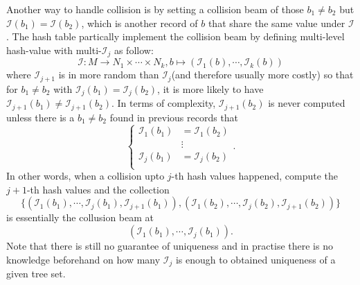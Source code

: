 \documentclass[11pt]{article}
\theoremstyle{definition}
\theoremstyle{remark}
\theoremstyle{plain}
\begin{document}
Another way to handle collision is by setting a collision beam of those $b_1 \neq b_2$ but $\mathcal{I}(b_1)=\mathcal{I}(b_2)$, which is another record of $b$ that share the same value under $\mathcal{I}$. The hash table partically implement the collision beam by defining multi-level hash-value with multi-$\mathcal{I}_j$ as follow:
\[
	\mathcal{I}:M \to N_1\times \cdots \times N_k, b \mapsto (\mathcal{I}_1(b),\cdots, \mathcal{I}_k(b))
\]
where $\mathcal{I}_{j+1}$ is in more random than $\mathcal{I}_j$(and therefore usually more costly) so that for $b_1\neq b_2$ with $\mathcal{I}_{j}(b_1) = \mathcal{I}_{j}(b_2)$, it is more likely to have $\mathcal{I}_{j+1}(b_1) \neq \mathcal{I}_{j+1}(b_2)$. In terms of complexity, $\mathcal{I}_{j+1}(b_2)$ is never computed unless there is a $b_1\neq b_2$ found in previous records that
\[
	\left\{
		\begin{aligned}
			\mathcal{I}_{1}(b_1) &= \mathcal{I}_1(b_2)\\
			&\vdots\\
			\mathcal{I}_{j}(b_1) &= \mathcal{I}_j(b_2)\\
		\end{aligned}
	\right..
\]
In other words, when a collision upto $j$-th hash values happened, compute the $j+1$-th hash values and the collection $$\{(\mathcal{I}_1(b_1),\cdots,\mathcal{I}_j(b_1), \mathcal{I}_{j+1}(b_1)) ,(\mathcal{I}_1(b_2),\cdots,\mathcal{I}_j(b_2), \mathcal{I}_{j+1}(b_2))\}$$ is essentially the collusion beam at $$(\mathcal{I}_1(b_1),\cdots,\mathcal{I}_j(b_1)).$$
Note that there is still no guarantee of uniqueness and in practise there is no knowledge beforehand on how many $\mathcal{I}_j$ is enough to obtained uniqueness of a given tree set.
\end{document}
